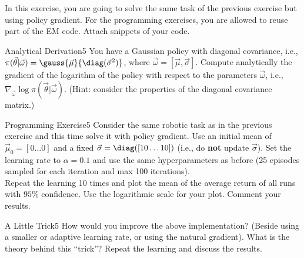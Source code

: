 In this exercise, you are going to solve the same task of the previous exercise but using policy gradient. 
For the programming exercises, you are allowed to reuse part of the EM code. 
Attach snippets of your code.

\begin{questions}


\begin{question}{Analytical Derivation}{5}
 	You have a Gaussian policy with diagonal covariance, i.e., $\pi(\vec \theta | \vec \omega) = \gauss{\vec \mu}{ \diag(\vec \sigma^2)}$, where $\vec \omega = [\vec \mu,\vec \sigma]$.
 	Compute analytically the gradient of the logarithm of the policy with respect to the parameters $\vec\omega$, i.e., $\nabla_{\vec\omega} \log \pi(\vec \theta | \vec \omega)$. (Hint: consider the properties of the diagonal covariance matrix.)
 	
 	\begin{answer}

	\end{answer}

\end{question}


\begin{question}{Programming Exercise}{5}
	Consider the same robotic task as in the previous exercise and this time solve it with policy gradient. 
	Use an initial mean of $\vec \mu_0 = [0 \dots 0]$ and a fixed $\vec \sigma = \diag([10 \dots 10])$ (i.e., do \textbf{not} update $\vec\sigma$). Set the learning rate to $\alpha=0.1$ and use the same hyperparameters as before (25 episodes sampled for each iteration and max 100 iterations).\\
	Repeat the learning 10 times and plot the mean of the average return of all runs with $95\%$ confidence.
	Use the logarithmic scale for your plot. Comment your results.
	
	\begin{answer}

	\end{answer}
\end{question}




\begin{question}{A Little Trick}{5}
	How would you improve the above implementation? (Beside using a smaller or adaptive learning rate, or using the natural gradient). What is the theory behind this ``trick''? Repeat the learning and discuss the results.
	

\end{question}
\end{questions}
